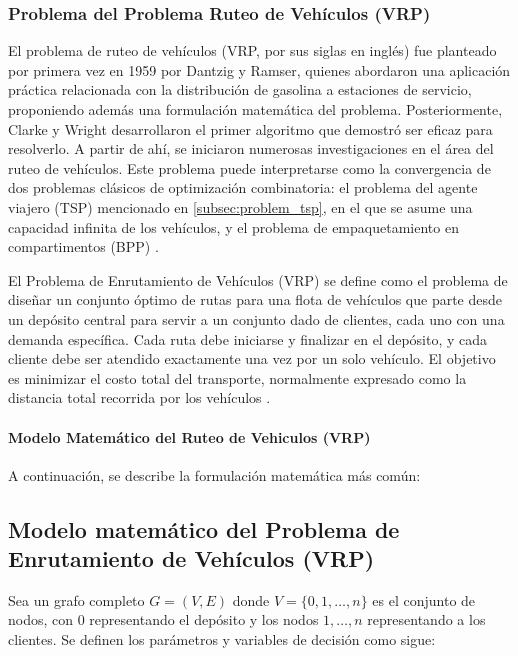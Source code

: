 \documentclass[12pt,titlepage,twoside,openright]{book}
\begin{document}
\subsubsection{Problema del Problema Ruteo de Vehículos (VRP)}
El problema de ruteo de vehículos (VRP, por sus siglas en inglés) fue planteado por primera vez en 1959 por Dantzig y Ramser, quienes abordaron una aplicación práctica relacionada con la distribución de gasolina a estaciones de servicio, proponiendo además una formulación matemática del problema. Posteriormente, Clarke y Wright desarrollaron el primer algoritmo que demostró ser eficaz para resolverlo. A partir de ahí, se iniciaron numerosas investigaciones en el área del ruteo de vehículos. Este problema puede interpretarse como la convergencia de dos problemas clásicos de optimización combinatoria: el problema del agente viajero (TSP) mencionado en \autoref{subsec:problem_tsp}, en el que se asume una capacidad infinita de los vehículos, y el problema de empaquetamiento en compartimentos (BPP) \cite{daza2009}.

El Problema de Enrutamiento de Vehículos (VRP) se define como el problema de diseñar un conjunto óptimo de rutas para una flota de vehículos que parte desde un depósito central para servir a un conjunto dado de clientes, cada uno con una demanda específica. Cada ruta debe iniciarse y finalizar en el depósito, y cada cliente debe ser atendido exactamente una vez por un solo vehículo. El objetivo es minimizar el costo total del transporte, normalmente expresado como la distancia total recorrida por los vehículos \cite{toth2014}.

\paragraph{Modelo Matemático del Ruteo de Vehiculos (VRP)} A continuación, se describe la formulación matemática más común:

\subsection{Modelo matemático del Problema de Enrutamiento de Vehículos (VRP)}

Sea un grafo completo \( G = (V, E) \) donde \( V = \{0, 1, \ldots, n\} \) es el conjunto de nodos, con \(0\) representando el depósito y los nodos \(1, \ldots, n\) representando a los clientes. Se definen los parámetros y variables de decisión como sigue:
\end{document}
